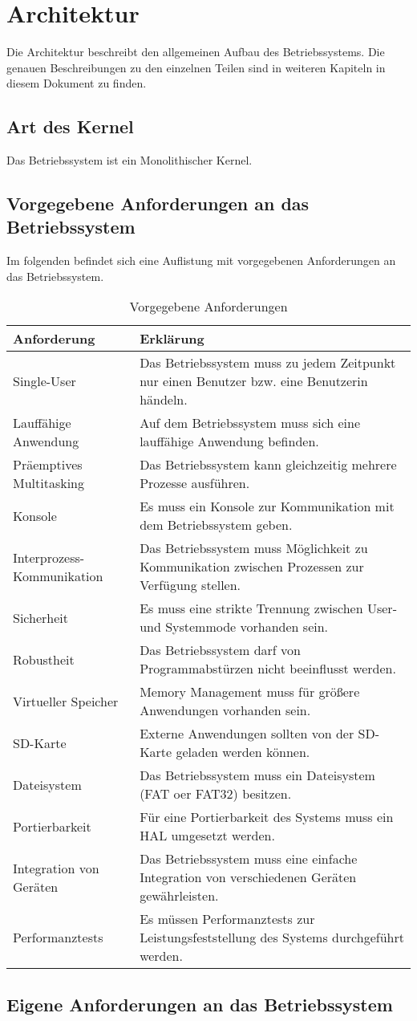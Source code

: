 \section{Architektur}
Die Architektur beschreibt den allgemeinen Aufbau des Betriebssystems. Die genauen Beschreibungen zu den einzelnen Teilen sind in weiteren Kapiteln in diesem Dokument zu finden.

\subsection{Art des Kernel}
Das Betriebssystem ist ein Monolithischer Kernel. 

\subsection{Vorgegebene Anforderungen an das Betriebssystem}
Im folgenden befindet sich eine Auflistung mit vorgegebenen Anforderungen an das Betriebssystem.

\begin{table}[H]
\begin{tabular}{ p{5cm}| p{9cm} }
  \textbf{Anforderung} & \textbf{Erklärung} \\ 
  \hline
  Single-User & Das Betriebssystem muss zu jedem Zeitpunkt nur einen Benutzer bzw. eine Benutzerin händeln. \\
  Lauffähige Anwendung & Auf dem Betriebssystem muss sich eine lauffähige Anwendung befinden. \\
  Präemptives Multitasking & Das Betriebssystem kann gleichzeitig mehrere Prozesse ausführen.\\
  Konsole & Es muss ein Konsole zur Kommunikation mit dem Betriebssystem geben. \\
  Interprozess-Kommunikation & Das Betriebssystem muss Möglichkeit zu Kommunikation zwischen Prozessen zur Verfügung stellen. \\
  Sicherheit & Es muss eine strikte Trennung zwischen User- und Systemmode vorhanden sein. \\
  Robustheit & Das Betriebssystem darf von Programmabstürzen nicht beeinflusst werden. \\
  Virtueller Speicher & Memory Management muss für größere Anwendungen vorhanden sein. \\
  SD-Karte & Externe Anwendungen sollten von der SD-Karte geladen werden können. \\
  Dateisystem & Das Betriebssystem muss ein Dateisystem (FAT oer FAT32) besitzen. \\
  Portierbarkeit & Für eine Portierbarkeit des Systems muss ein HAL umgesetzt werden. \\
  Integration von Geräten & Das Betriebssystem muss eine einfache Integration von verschiedenen Geräten gewährleisten. \\
  Performanztests & Es müssen Performanztests zur Leistungsfeststellung des Systems durchgeführt werden. \\  
 \end{tabular}
 \caption{Vorgegebene Anforderungen}
 \label{table:Prescribed-Requirements}
\end{table}

\subsection{Eigene Anforderungen an das Betriebssystem}

\pagebreak 